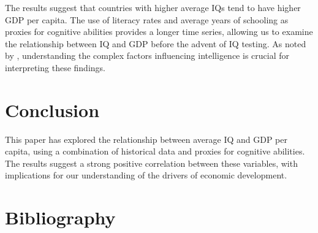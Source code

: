 \documentclass{article}
\begin{document}
The results suggest that countries with higher average IQs tend to have higher GDP per capita. The use of literacy rates and average years of schooling as proxies for cognitive abilities provides a longer time series, allowing us to examine the relationship between IQ and GDP before the advent of IQ testing. As noted by \cite{neisser1996intelligence}, understanding the complex factors influencing intelligence is crucial for interpreting these findings.

\section{Conclusion}

This paper has explored the relationship between average IQ and GDP per capita, using a combination of historical data and proxies for cognitive abilities. The results suggest a strong positive correlation between these variables, with implications for our understanding of the drivers of economic development.

\section{Bibliography}



\end{document}
